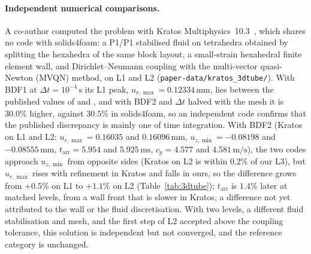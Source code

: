 \paragraph{Independent numerical comparisons.}
A co-author computed the problem with Kratos Multiphysics~10.3~\citep{Dadvand2010}, which shares no code with solids4foam: a P1/P1 stabilised fluid on tetrahedra obtained by splitting the hexahedra of the same block layout, a small-strain hexahedral finite element wall, and Dirichlet--Neumann coupling with the multi-vector quasi-Newton (MVQN) method, on L1 and L2 (\texttt{paper-data/kratos\_3dtube/}).
With BDF1 at $\Delta t = 10^{-4}\,\mathrm{s}$ its L1 peak, $u_{r,\max} = 0.12334\,\mathrm{mm}$, lies between the published values of \citet{Lozovskiy2019} and \citet{Eken2016}, and with BDF2 and $\Delta t$ halved with the mesh it is $30.0\%$ higher, against $30.5\%$ in solids4foam, so an independent code confirms that the published discrepancy is mainly one of time integration.
With BDF2 (Kratos on L1 and L2: $u_{r,\max} = 0.16035$ and $0.16096\,\mathrm{mm}$, $u_{z,\min} = -0.08198$ and $-0.08555\,\mathrm{mm}$, $t_\mathrm{arr} = 5.954$ and $5.925\,\mathrm{ms}$, $c_p = 4.577$ and $4.581\,\mathrm{m/s}$), the two codes approach $u_{z,\min}$ from opposite sides (Kratos on L2 is within $0.2\%$ of our L3), but $u_{r,\max}$ rises with refinement in Kratos and falls in ours, so the difference grows from $+0.5\%$ on L1 to $+1.1\%$ on L2 (Table~\ref{tab:3dtube}); $t_\mathrm{arr}$ is $1.4\%$ later at matched levels, from a wall front that is slower in Kratos, a difference not yet attributed to the wall or the fluid discretisation.
With two levels, a different fluid stabilisation and mesh, and the first step of L2 accepted above the coupling tolerance, this solution is independent but not converged, and the reference category is unchanged.


